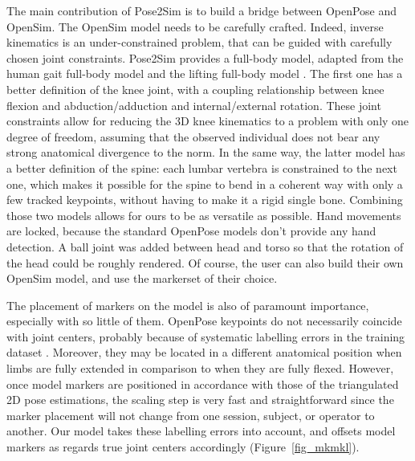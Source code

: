 The main contribution of Pose2Sim is to build a bridge between OpenPose and OpenSim. The OpenSim model needs to be carefully crafted. Indeed, inverse kinematics is an under-constrained problem, that can be guided with carefully chosen joint constraints. Pose2Sim provides a full-body model, adapted from the human gait full-body model \cite{Rajagopal2016} and the lifting full-body model \cite{Beaucage-Gauvreau2019}. The first one has a better definition of the knee joint, with a coupling relationship between knee flexion and abduction/adduction and internal/external rotation. These joint constraints allow for reducing the 3D knee kinematics to a problem with only one degree of freedom, assuming that the observed individual does not bear any strong anatomical divergence to the norm. In the same way, the latter model has a better definition of the spine: each lumbar vertebra is constrained to the next one, which makes it possible for the spine to bend in a coherent way with only a few tracked keypoints, without having to make it a rigid single bone. Combining those two models allows for ours to be as versatile as possible. Hand movements are locked, because the standard OpenPose models don't provide any hand detection. A ball joint was added between head and torso so that the rotation of the head could be roughly rendered. Of course, the user can also build their own OpenSim model, and use the markerset of their choice.

The placement of markers on the model is also of paramount importance, especially with so little of them. OpenPose keypoints do not necessarily coincide with joint centers, probably because of systematic labelling errors in the training dataset \cite{Needham2021b}. Moreover, they may be located in a different anatomical position when limbs are fully extended in comparison to when they are fully flexed. However, once model markers are positioned in accordance with those of the triangulated 2D pose estimations, the scaling step is very fast and straightforward since the marker placement will not change from one session, subject, or operator to another. Our model takes these labelling errors into account, and offsets model markers as regards true joint centers accordingly (Figure~\ref{fig_mkmkl}).

